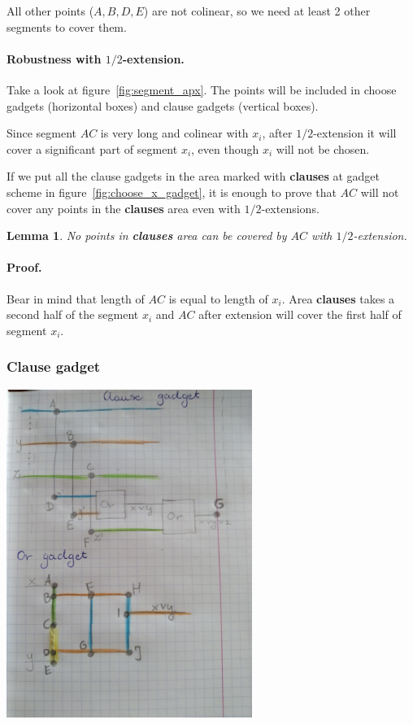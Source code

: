 \documentclass[en]{pracamgr}
\newtheorem{lemma}{Lemma}[section]
\begin{document}
All other points ($A, B, D, E$) are not colinear,
so we need at least 2 other segments to cover them.

\paragraph{Robustness with $1/2$-extension.}
Take a look at figure~\ref{fig:segment_apx}.
The points will be included in choose gadgets (horizontal boxes)
and clause gadgets (vertical boxes).

Since segment $AC$ is very long
and colinear with $x_i$, after $1/2$-extension
it will cover a significant part of segment $x_i$,
even though $x_i$ will not be chosen.

If we put all the clause gadgets in the area
marked with \textbf{clauses} at gadget scheme in figure~\ref{fig:choose_x_gadget},
it is enough to prove that $AC$ will not cover any points
in the \textbf{clauses} area even with $1/2$-extensions.

\begin{lemma}
No points in \textbf{clauses} area can be covered
by $AC$ with $1/2$-extension.
\end{lemma}

\paragraph{Proof.}
Bear in mind that length of $AC$ is equal to length of $x_i$.
Area \textbf{clauses} takes a second half
of the segment $x_i$ and $AC$ after extension will cover the first
half of segment $x_i$.

\subsubsection{Clause gadget}
\includegraphics[width=0.6\textwidth]{clause_gadget.jpg}
\end{document}
